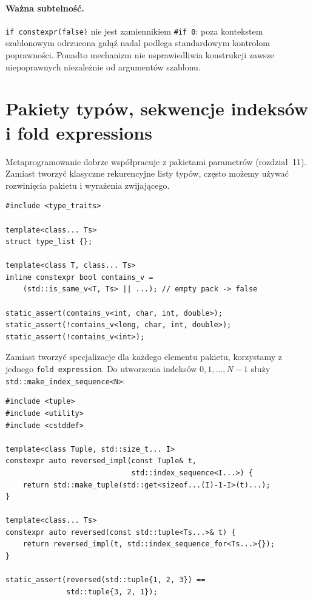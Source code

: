 \paragraph{Ważna subtelność.}
\texttt{if constexpr(false)} nie jest zamiennikiem
\texttt{\#if 0}: poza kontekstem szablonowym odrzucona gałąź nadal
podlega standardowym kontrolom poprawności. Ponadto mechanizm nie
usprawiedliwia konstrukcji zawsze niepoprawnych niezależnie od
argumentów szablonu.

\section{Pakiety typów, sekwencje indeksów i fold expressions}
\label{sec:cpp9-type-lists}

Metaprogramowanie dobrze współpracuje z pakietami parametrów
(rozdział~11). Zamiast tworzyć klasyczne rekurencyjne listy typów,
często możemy używać rozwinięcia pakietu i wyrażenia zwijającego.

\begin{lstlisting}
#include <type_traits>

template<class... Ts>
struct type_list {};

template<class T, class... Ts>
inline constexpr bool contains_v =
    (std::is_same_v<T, Ts> || ...); // empty pack -> false

static_assert(contains_v<int, char, int, double>);
static_assert(!contains_v<long, char, int, double>);
static_assert(!contains_v<int>);
\end{lstlisting}

Zamiast tworzyć specjalizacje dla każdego elementu pakietu, korzystamy
z jednego \texttt{fold expression}. Do utworzenia indeksów
$0,1,\ldots,N-1$ służy \texttt{std::make\_index\_sequence<N>}:

\begin{lstlisting}
#include <tuple>
#include <utility>
#include <cstddef>

template<class Tuple, std::size_t... I>
constexpr auto reversed_impl(const Tuple& t,
                             std::index_sequence<I...>) {
    return std::make_tuple(std::get<sizeof...(I)-1-I>(t)...);
}

template<class... Ts>
constexpr auto reversed(const std::tuple<Ts...>& t) {
    return reversed_impl(t, std::index_sequence_for<Ts...>{});
}

static_assert(reversed(std::tuple{1, 2, 3}) ==
              std::tuple{3, 2, 1});
\end{lstlisting}

